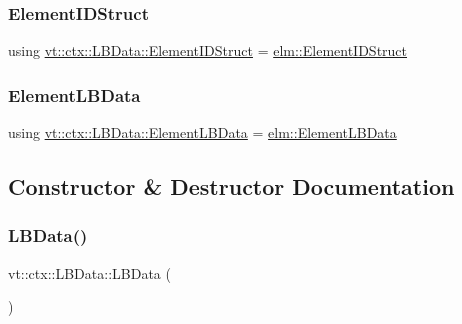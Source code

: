 \subsubsection{\texorpdfstring{Element\+I\+D\+Struct}{ElementIDStruct}}
{\footnotesize\ttfamily using \hyperlink{structvt_1_1ctx_1_1_l_b_data_aad9fac05c3faf80173b273d900db6fb1}{vt\+::ctx\+::\+L\+B\+Data\+::\+Element\+I\+D\+Struct} =  \hyperlink{structvt_1_1elm_1_1_element_i_d_struct}{elm\+::\+Element\+I\+D\+Struct}}

\mbox{\label{structvt_1_1ctx_1_1_l_b_data_a11f1aeb75c01ae0c77d96f94ce1994bb}} 
\subsubsection{\texorpdfstring{Element\+L\+B\+Data}{ElementLBData}}
{\footnotesize\ttfamily using \hyperlink{structvt_1_1ctx_1_1_l_b_data_a11f1aeb75c01ae0c77d96f94ce1994bb}{vt\+::ctx\+::\+L\+B\+Data\+::\+Element\+L\+B\+Data} =  \hyperlink{structvt_1_1elm_1_1_element_l_b_data}{elm\+::\+Element\+L\+B\+Data}}



\subsection{Constructor \& Destructor Documentation}
\mbox{\label{structvt_1_1ctx_1_1_l_b_data_a2df28bac4813faec6857a0df13692e09}} 
\subsubsection{\texorpdfstring{L\+B\+Data()}{LBData()}\hspace{0.1cm}{\footnotesize\ttfamily [1/3]}}
{\footnotesize\ttfamily vt\+::ctx\+::\+L\+B\+Data\+::\+L\+B\+Data (\begin{DoxyParamCaption}{ }\end{DoxyParamCaption})\hspace{0.3cm}{\ttfamily [default]}}

\mbox{\label{structvt_1_1ctx_1_1_l_b_data_aeee7259db248f19afcc19179c1a623ba}} 
